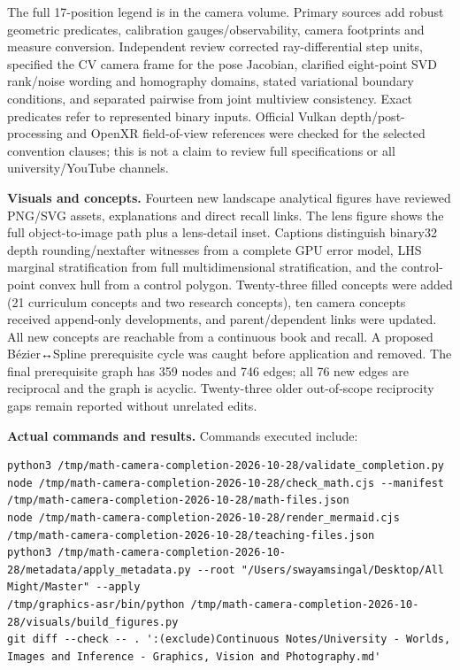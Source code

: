 The full 17-position legend is in the camera volume. Primary sources add robust geometric predicates, calibration gauges/observability, camera footprints and measure conversion. Independent review corrected ray-differential step units, specified the CV camera frame for the pose Jacobian, clarified eight-point SVD rank/noise wording and homography domains, stated variational boundary conditions, and separated pairwise from joint multiview consistency. Exact predicates refer to represented binary inputs. Official Vulkan depth/post-processing and OpenXR field-of-view references were checked for the selected convention clauses; this is not a claim to review full specifications or all university/YouTube channels.

\textbf{Visuals and concepts.} Fourteen new landscape analytical figures have reviewed PNG/SVG assets, explanations and direct recall links. The lens figure shows the full object-to-image path plus a lens-detail inset. Captions distinguish binary32 depth rounding/nextafter witnesses from a complete GPU error model, LHS marginal stratification from full multidimensional stratification, and the control-point convex hull from a control polygon. Twenty-three filled concepts were added (21 curriculum concepts and two research concepts), ten camera concepts received append-only developments, and parent/dependent links were updated. All new concepts are reachable from a continuous book and recall. A proposed Bézier↔Spline prerequisite cycle was caught before application and removed. The final prerequisite graph has 359 nodes and 746 edges; all 76 new edges are reciprocal and the graph is acyclic. Twenty-three older out-of-scope reciprocity gaps remain reported without unrelated edits.

\textbf{Actual commands and results.} Commands executed include:

\begin{verbatim}
python3 /tmp/math-camera-completion-2026-10-28/validate_completion.py
node /tmp/math-camera-completion-2026-10-28/check_math.cjs --manifest /tmp/math-camera-completion-2026-10-28/math-files.json
node /tmp/math-camera-completion-2026-10-28/render_mermaid.cjs /tmp/math-camera-completion-2026-10-28/teaching-files.json
python3 /tmp/math-camera-completion-2026-10-28/metadata/apply_metadata.py --root "/Users/swayamsingal/Desktop/All Might/Master" --apply
/tmp/graphics-asr/bin/python /tmp/math-camera-completion-2026-10-28/visuals/build_figures.py
git diff --check -- . ':(exclude)Continuous Notes/University - Worlds, Images and Inference - Graphics, Vision and Photography.md'
\end{verbatim}

